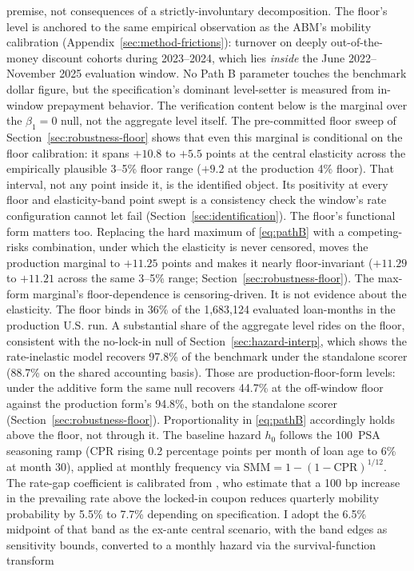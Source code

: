 \documentclass[12pt]{article}
\begin{document}
premise, not consequences of a strictly-involuntary decomposition. The floor's level is anchored to the same empirical observation as the ABM's mobility calibration (Appendix~\ref{sec:method-frictions}): turnover on deeply out-of-the-money discount cohorts during 2023--2024, which lies \emph{inside} the June 2022--November 2025 evaluation window. No Path B parameter touches the benchmark dollar figure, but the specification's dominant level-setter is measured from in-window prepayment behavior. The verification content below is the marginal over the $\beta_1 = 0$ null, not the aggregate level itself. The pre-committed floor sweep of Section~\ref{sec:robustness-floor} shows that even this marginal is conditional on the floor calibration: it spans $+10.8$ to $+5.5$ points at the central elasticity across the empirically plausible 3--5\% floor range ($+9.2$ at the production 4\% floor). That interval, not any point inside it, is the identified object. Its positivity at every floor and elasticity-band point swept is a consistency check the window's rate configuration cannot let fail (Section~\ref{sec:identification}). The floor's functional form matters too. Replacing the hard maximum of \eqref{eq:pathB} with a competing-risks combination, under which the elasticity is never censored, moves the production marginal to $+11.25$ points and makes it nearly floor-invariant ($+11.29$ to $+11.21$ across the same 3--5\% range; Section~\ref{sec:robustness-floor}). The max-form marginal's floor-dependence is censoring-driven. It is not evidence about the elasticity. The floor binds in 36\% of the 1,683,124 evaluated loan-months in the production U.S. run. A substantial share of the aggregate level rides on the floor, consistent with the no-lock-in null of Section~\ref{sec:hazard-interp}, which shows the rate-inelastic model recovers 97.8\% of the benchmark under the standalone scorer (88.7\% on the shared accounting basis). Those are production-floor-form levels: under the additive form the same null recovers 44.7\% at the off-window floor against the production form's 94.8\%, both on the standalone scorer (Section~\ref{sec:robustness-floor}). Proportionality in \eqref{eq:pathB} accordingly holds above the floor, not through it. The baseline hazard $h_0$ follows the 100~PSA seasoning ramp (CPR rising 0.2 percentage points per month of loan age to 6\% at month 30), applied at monthly frequency via $\mathrm{SMM} = 1-(1-\mathrm{CPR})^{1/12}$. The rate-gap coefficient is calibrated from \citet{liebersohn2024}, who estimate that a 100 bp increase in the prevailing rate above the locked-in coupon reduces quarterly mobility probability by 5.5\% to 7.7\% depending on specification. I adopt the 6.5\% midpoint of that band as the ex-ante central scenario, with the band edges as sensitivity bounds, converted to a monthly hazard via the survival-function transform
\end{document}
